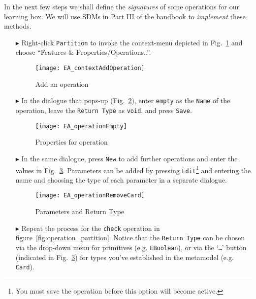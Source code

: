 In the next few steps we shall define the \emph{signatures} of some operations for our learning box. We will use SDMs in Part III of the handbook to
\emph{implement} these methods.

\begin{enumerate}
\item[$\blacktriangleright$] Right-click \texttt{Partition} to invoke the context-menu depicted in Fig.~\ref{fig:add_operation} and choose ``Features \&
Properties/Operations..''.

\begin{figure}[htbp]
	\centering
  \texttt{[image: EA\_contextAddOperation]}
	\caption{Add an operation}
	\label{fig:add_operation}
\end{figure}
\FloatBarrier

\item[$\blacktriangleright$] In the dialogue that pops-up (Fig.~\ref{fig:operation_properties}), enter \texttt{empty} as the \texttt{Name} of the operation,
leave the \texttt{Return Type} as \texttt{void}, and press \texttt{Save}.

\begin{figure}[htbp]
	\centering
  	\texttt{[image: EA\_operationEmpty]}
	\caption{Properties for operation}
	\label{fig:operation_properties}
\end{figure}
\FloatBarrier

\item[$\blacktriangleright$] In the same dialogue, press \texttt{New} to add further operations and enter the values in Fig.~\ref{fig:operation_parameters}. 
Parameters can be added by pressing \texttt{Edit}\footnote{You must save the operation before this option will become active.} and entering the name and
choosing the type of each parameter in a separate dialogue.

\begin{figure}[htbp]
	\centering
  \texttt{[image: EA\_operationRemoveCard]}
	\caption{Parameters and Return Type}
	\label{fig:operation_parameters}
\end{figure}
\FloatBarrier

\vfill
\pagebreak

\item[$\blacktriangleright$] Repeat the process for the \texttt{check} operation in figure~\ref{fig:operation_partition}.
Notice that the \texttt{Return Type} can be chosen via the drop-down menu for primitives (e.g. \texttt{EBoolean}), or via the `\texttt{\ldots}' button
(indicated in Fig.~\ref{fig:operation_parameters}) for types you've established in the metamodel (e.g. \texttt{Card}).
\end{enumerate}

